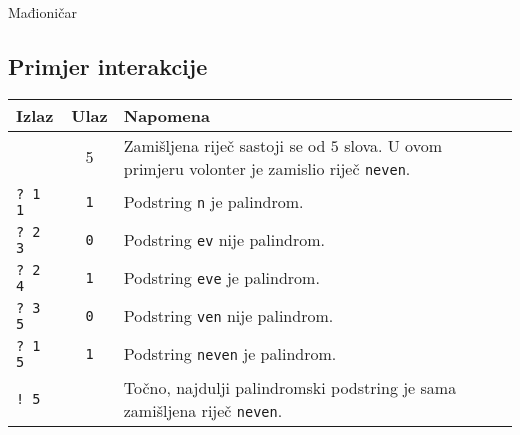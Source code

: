 \begin{statement}[
  problempoints=100,
  timelimit=5 sekundi,
  memorylimit=512 MiB,
]{Mađioničar}
\subsection*{Primjer interakcije}
{\renewcommand{\arraystretch}{1.4}
  \setlength{\tabcolsep}{6pt}
  \begin{tabular}{lcl}
    Izlaz & Ulaz & Napomena \\ \midrule
      & 5 & Zamišljena riječ sastoji se od $5$ slova. U ovom primjeru volonter je zamislio riječ \texttt{neven}. \\
    \texttt{\frenchspacing? 1 1} & \texttt{1} & Podstring \texttt{n} je palindrom. \\
    \texttt{\frenchspacing? 2 3} & \texttt{0} & Podstring \texttt{ev} nije palindrom. \\
    \texttt{\frenchspacing? 2 4} & \texttt{1} & Podstring \texttt{eve} je palindrom. \\
    \texttt{\frenchspacing? 3 5} & \texttt{0} & Podstring \texttt{ven} nije palindrom. \\
    \texttt{\frenchspacing? 1 5} & \texttt{1} & Podstring \texttt{neven} je palindrom. \\
    \texttt{\frenchspacing! 5} & & Točno, najdulji palindromski podstring je sama zamišljena riječ \texttt{neven}. \\
\end{tabular}}


\end{statement}


